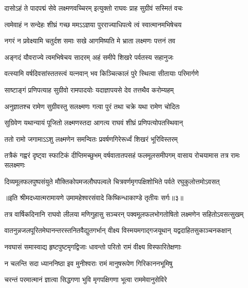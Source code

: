 \twolineshloka
{दासोऽहं ते पादपद्मं सेवे लक्ष्मणवच्चिरम्}
{इत्युक्तो राघवः प्राह सुग्रीवं सस्मितं वचः} %

\twolineshloka
{त्वमेवाहं न सन्देहः शीघ्रं गच्छ ममऽऽज्ञया}
{पुरराज्याधिपत्ये त्वं स्वात्मानमभिषेचय} %

\twolineshloka
{नगरं न प्रवेक्ष्यामि चतुर्दश समाः सखे}
{आगमिष्यति मे भ्राता लक्ष्मणः पत्तनं तव} %

\twolineshloka
{अङ्गदं यौवराज्ये त्वमभिषेचय सादरम्}
{अहं समीपे शिखरे पर्वतस्य सहानुजः} %

\twolineshloka
{वत्स्यामि वर्षदिवसांस्ततस्त्वं यत्नवान् भव}
{किञ्चित्कालं पुरे स्थित्वा सीतायाः परिमार्गणे} %

\twolineshloka
{साष्टाङ्गं प्रणिपत्याह सुग्रीवो रामपादयोः}
{यदाज्ञापयसे देव तत्तथैव करोम्यहम्} %

\twolineshloka
{अनुज्ञातश्च रामेण सुग्रीवस्तु सलक्ष्मणः}
{गत्वा पुरं तथा चक्रे यथा रामेण चोदितः} %

\twolineshloka
{सुग्रिवेण यथान्यायं पूजितो लक्ष्मणस्तदा}
{आगत्य राघवं शीघ्रं प्रणिपत्योपतस्थिवान्} %

\twolineshloka
{ततो रामो जगामाऽऽशु लक्ष्मणेन समन्वितः}
{प्रवर्षणगिरेरूर्ध्वं शिखरं भूरिविस्तरम्} %

\threelineshloka
{तत्रैकं गह्वरं दृष्ट्वा स्फाटिकं दीप्तिमच्छुभम्}
{वर्षवातातपसहं फलमूलसमीपगम्}
{वासाय रोचयामास तत्र रामः सलक्ष्मणः} %

\twolineshloka
{दिव्यमूलफलपुष्पसंयुते मौक्तिकोपमजलौघपल्वले}
{चित्रवर्णमृगपक्षिशोभिते पर्वते रघुकुलोत्तमोऽवसत्} %

{॥इति श्रीमदध्यात्मरामायणे उमामहेश्वरसंवादे किष्किन्धाकाण्डे
तृतीयः सर्गः॥३॥
}




\twolineshloka
{तत्र वार्षिकदिनानि राघवो लीलया मणिगुहासु सञ्चरन्}
{पक्वमूलफलभोगतोषितो लक्ष्मणेन सहितोऽवसत्सुखम्} %

\twolineshloka
{वातनुन्नजलपूरितमेघानन्तरस्तनितवैद्युतगर्भान्}
{वीक्ष्य विस्मयमगाद्गजयूथान् यद्वदाहितसुकाञ्चनकक्षान्} %

\twolineshloka
{नवघासं समास्वाद्य हृष्टपुष्टमृगद्विजाः}
{धावन्तो परितो रामं वीक्ष्य विस्फारितेक्षणाः} %

\twolineshloka
{न चलन्ति सदा ध्याननिष्ठा इव मुनीश्वराः}
{रामं मानुषरूपेण गिरिकाननभूमिषु} %

\twolineshloka
{चरन्तं परमात्मानं ज्ञात्वा सिद्धगणा भुवि}
{मृगपक्षिगणा भूत्वा राममेवानुसेविरे} %

